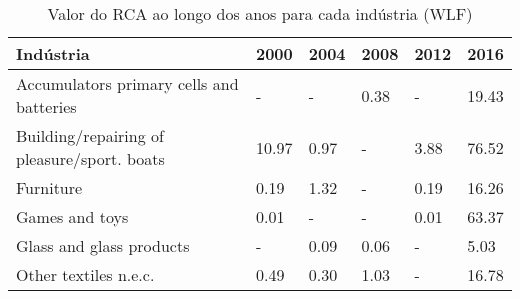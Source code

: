 \begin{table}
\centering
\caption{Valor do RCA ao longo dos anos para cada indústria (WLF)}
\begin{tabular}{p{6cm}p{1.5cm}p{1.5cm}p{1.5cm}p{1.5cm}p{1.5cm}}
\toprule
                                  Indústria &  2000 & 2004 & 2008 & 2012 &  2016 \\
\midrule
   Accumulators primary cells and batteries &     - &    - & 0.38 &    - & 19.43 \\
Building/repairing of pleasure/sport. boats & 10.97 & 0.97 &    - & 3.88 & 76.52 \\
                                  Furniture &  0.19 & 1.32 &    - & 0.19 & 16.26 \\
                             Games and toys &  0.01 &    - &    - & 0.01 & 63.37 \\
                   Glass and glass products &     - & 0.09 & 0.06 &    - &  5.03 \\
                      Other textiles n.e.c. &  0.49 & 0.30 & 1.03 &    - & 16.78 \\
\bottomrule
\end{tabular}
\end{table}
